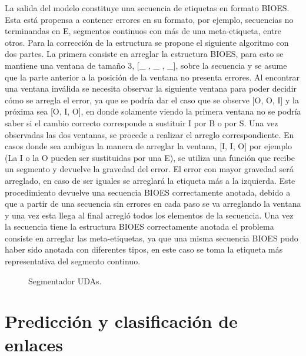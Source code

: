 La salida del modelo constituye una secuencia de etiquetas en formato BIOES. Esta está propensa
a contener errores en su formato, por ejemplo, secuencias no terminandas en E, segmentos continuos con más de una 
meta-etiqueta, entre otros.
Para la corrección de la estructura se propone el siguiente algoritmo con dos partes. La primera
consiste en arreglar la estructura BIOES, para esto se mantiene una ventana de tamaño
3, [\_ , \_ , \_], sobre la secuencia y se asume que la parte anterior a la posición de la ventana no presenta errores. Al encontrar una
ventana inválida se necesita observar la siguiente ventana para poder decidir cómo se arregla el error, ya que se
podría dar el caso que se observe [O, O, I] y la próxima sea [O, I, O], en donde solamente viendo la primera ventana no se podría saber si el cambio 
correcto corresponde a sustituir I por B o por S. Una vez observadas las dos ventanas, se procede a realizar el 
arreglo correspondiente. En casos donde sea ambigua la manera de arreglar la ventana, [I, I, O] por ejemplo
(La I o la O pueden ser 
sustituidas por una E), se utiliza una función que recibe un segmento y devuelve la gravedad del error.
El error con mayor gravedad será arreglado, en caso de ser iguales se arreglará la etiqueta más a la izquierda.
Este procedimiento devuelve una secuencia BIOES correctamente anotada, debido a que a partir de una secuencia sin 
errores en cada paso se va arreglando la ventana y una vez esta llega al final arregló todos los elementos de la secuencia.
Una vez la secuencia tiene la estructura BIOES correctamente anotada el problema
consiste en arreglar las meta-etiquetas, ya que una misma secuencia BIOES pudo haber sido anotada con diferentes
tipos, en este caso se toma la etiqueta más representativa del segmento continuo.

\begin{figure}[p]
	\begin{center}
		\begin{center}
            
        \end{center}
	    \caption{Segmentador UDAs.}\label{fig:segmenter_model}
	\end{center}
\end{figure}

\newpage

\section{Predicción y clasificación de enlaces}

